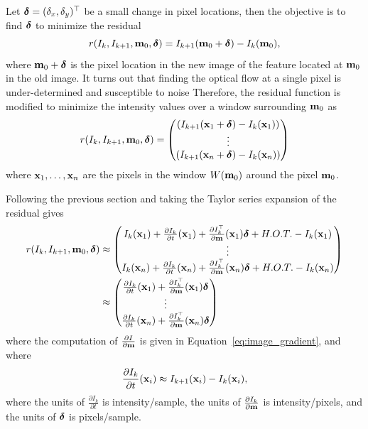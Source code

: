Let $\boldsymbol{\delta} = (\delta_x, \delta_y)^\top$ be a small change in pixel locations, then the objective is to find $\boldsymbol{\delta}$ to minimize the residual
\begin{equation}\label{eq:optical_flow_1}
r(I_k, I_{k+1}, \mbf_0, \deltabf) = I_{k+1}(\mbf_0+\deltabf) - I_k(\mbf_0),
\end{equation}
where $\mathbf{m}_0+\boldsymbol{\delta}$ is the pixel location in the new image of the feature located at $\mathbf{m}_0$ in the old image.  It turns out that finding the optical flow at a single pixel is under-determined and susceptible to noise  Therefore, the residual function is modified to minimize the intensity values over a window surrounding $\mathbf{m}_0$ as
\begin{equation}\label{eq:optical_flow_1}
r(I_k, I_{k+1}, \mbf_0, \deltabf) = \begin{pmatrix} \left(I_{k+1}(\xbf_1+\deltabf) - I_k(\xbf_1)\right) \\
\vdots \\
\left(I_{k+1}(\xbf_n+\deltabf) - I_k(\xbf_n)\right)
\end{pmatrix}
\end{equation}
where $\mathbf{x}_1, \dots, \mathbf{x}_n$ are the pixels in the window $W(\mathbf{m}_0)$ around the pixel $\mathbf{m}_0$.  


Following the previous section and taking the Taylor series expansion of the residual gives
\begin{align*}
r(I_k, I_{k+1}, \mathbf{m}_0, \boldsymbol{\delta}) &\approx \begin{pmatrix} I_k(\mathbf{x}_1) + \frac{\partial I_k}{\partial t}(\mathbf{x}_1) + \frac{\partial I_k^\top}{\partial \mathbf{m}}(\mathbf{x}_1)\boldsymbol{\delta} + H.O.T. - I_k(\mathbf{x}_1) \\
\vdots \\
I_k(\mathbf{x}_n) + \frac{\partial I_k}{\partial t}(\mathbf{x}_n) + \frac{\partial I_k^\top}{\partial \mathbf{m}}(\mathbf{x}_n)\boldsymbol{\delta} + H.O.T. - I_k(\mathbf{x}_n)
\end{pmatrix} \\
	&\approx \begin{pmatrix} \frac{\partial I_k}{\partial t}(\mathbf{x}_1) + \frac{\partial I_k^\top}{\partial \mathbf{m}}(\mathbf{x}_1)\boldsymbol{\delta} \\
	\vdots \\
	\frac{\partial I_k}{\partial t}(\mathbf{x}_n) + \frac{\partial I_k^\top}{\partial \mathbf{m}}(\mathbf{x}_n)\boldsymbol{\delta}
	\end{pmatrix}
\end{align*}
where the computation of $\frac{\partial I}{\partial \mathbf{m}}$ is given in Equation~\eqref{eq:image_gradient}, and where 
\[
\frac{\partial I_k}{\partial t}(\mathbf{x}_i) \approx I_{k+1}(\mathbf{x}_i) - I_k(\mathbf{x}_i),
\]
where the units of $\frac{\partial I_k}{\partial t}$ is intensity/sample, the units of $\frac{\partial I_k}{\partial \mathbf{m}}$ is intensity/pixels, and the units of $\boldsymbol{\delta}$ is pixels/sample.  

